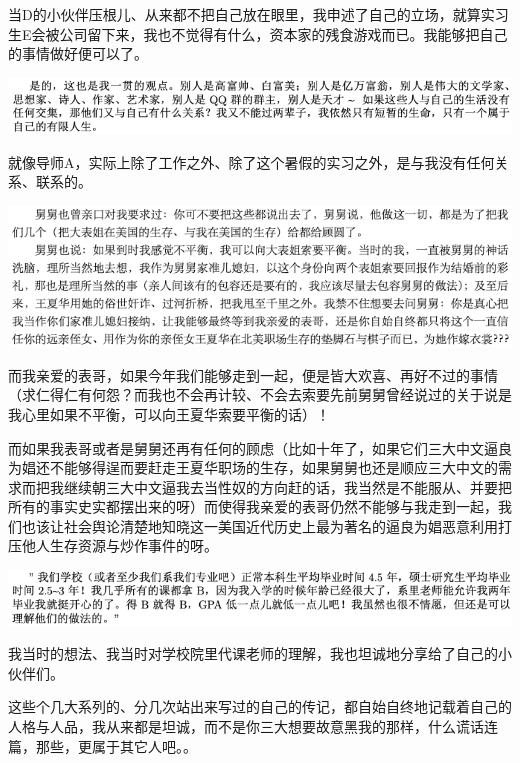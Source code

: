 \documentclass[9pt, b5paper]{article}
\begin{document}
当D的小伙伴压根儿、从来都不把自己放在眼里，我申述了自己的立场，就算实习生E会被公司留下来，我也不觉得有什么，资本家的残食游戏而已。我能够把自己的事情做好便可以了。 

\begin{center}
\includegraphics[width=.9\linewidth]{./pic/backups_plans_20210514_122038.png}
\end{center}

就像导师A，实际上除了工作之外、除了这个暑假的实习之外，是与我没有任何关系、联系的。

\begin{center}
\includegraphics[width=.9\linewidth]{./pic/backups_plans_20210514_222850.png}
\end{center}

而我亲爱的表哥，如果今年我们能够走到一起，便是皆大欢喜、再好不过的事情（求仁得仁有何怨？而我也不会再计较、不会去索要先前舅舅曾经说过的关于说是我心里如果不平衡，可以向王夏华索要平衡的话）！

而如果我表哥或者是舅舅还再有任何的顾虑（比如十年了，如果它们三大中文逼良为娼还不能够得逞而要赶走王夏华职场的生存，如果舅舅也还是顺应三大中文的需求而把我继续朝三大中文逼我去当性奴的方向赶的话，我当然是不能服从、并要把所有的事实史实都摆出来的呀）而使得我亲爱的表哥仍然不能够与我走到一起，我们也该让社会舆论清楚地知晓这一美国近代历史上最为著名的逼良为娼恶意利用打压他人生存资源与炒作事件的呀。 

\begin{center}
\includegraphics[width=.9\linewidth]{./pic/backups_plans_20210514_124849.png}
\end{center}

我当时的想法、我当时对学校院里代课老师的理解，我也坦诚地分享给了自己的小伙伴们。

这些个几大系列的、分几次站出来写过的自己的传记，都自始自终地记载着自己的人格与人品，我从来都是坦诚，而不是你三大想要故意黑我的那样，什么谎话连篇，那些，更属于其它人吧。。
\end{document}
